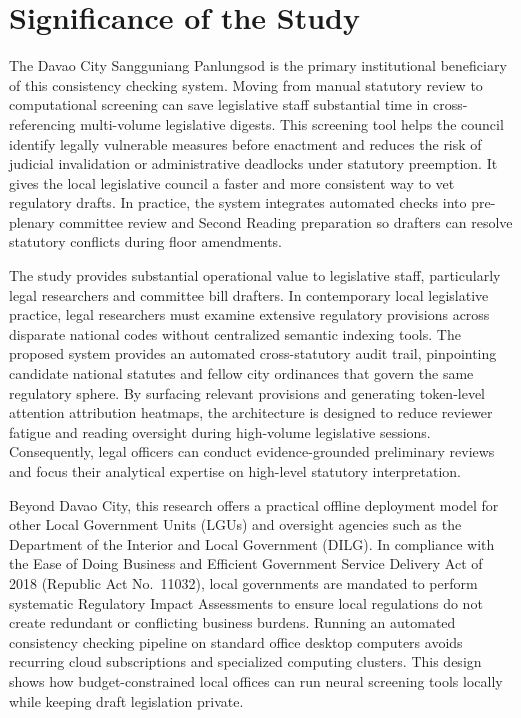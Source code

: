 \section{Significance of the Study}
The Davao City Sangguniang Panlungsod is the primary institutional beneficiary of this consistency checking system. Moving from manual statutory review to computational screening can save legislative staff substantial time in cross-referencing multi-volume legislative digests. This screening tool helps the council identify legally vulnerable measures before enactment and reduces the risk of judicial invalidation or administrative deadlocks under statutory preemption. It gives the local legislative council a faster and more consistent way to vet regulatory drafts. In practice, the system integrates automated checks into pre-plenary committee review and Second Reading preparation so drafters can resolve statutory conflicts during floor amendments.

The study provides substantial operational value to legislative staff, particularly legal researchers and committee bill drafters. In contemporary local legislative practice, legal researchers must examine extensive regulatory provisions across disparate national codes without centralized semantic indexing tools. The proposed system provides an automated cross-statutory audit trail, pinpointing candidate national statutes and fellow city ordinances that govern the same regulatory sphere. By surfacing relevant provisions and generating token-level attention attribution heatmaps, the architecture is designed to reduce reviewer fatigue and reading oversight during high-volume legislative sessions. Consequently, legal officers can conduct evidence-grounded preliminary reviews and focus their analytical expertise on high-level statutory interpretation.

Beyond Davao City, this research offers a practical offline deployment model for other Local Government Units (LGUs) and oversight agencies such as the Department of the Interior and Local Government (DILG). In compliance with the Ease of Doing Business and Efficient Government Service Delivery Act of 2018 (Republic Act No.~11032), local governments are mandated to perform systematic Regulatory Impact Assessments to ensure local regulations do not create redundant or conflicting business burdens. Running an automated consistency checking pipeline on standard office desktop computers avoids recurring cloud subscriptions and specialized computing clusters. This design shows how budget-constrained local offices can run neural screening tools locally while keeping draft legislation private.

